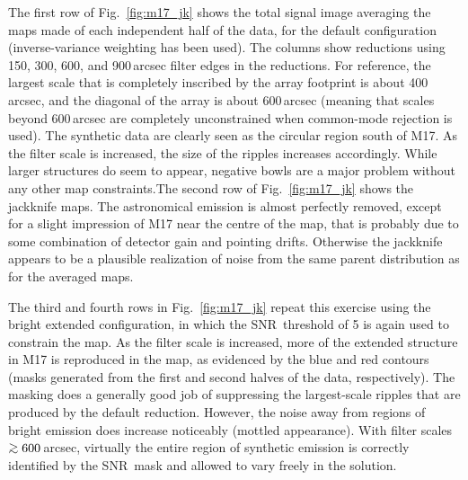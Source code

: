 \documentclass[useAMS,usenatbib,nofootinbib]{mn2e}
\newcommand{\snr}{SNR}
\def\gsim{\mathrel{\lower2.5pt\vbox{\lineskip=0pt\baselineskip=0pt
          \hbox{$>$}\hbox{$\sim$}}}}
\begin{document}
The first row of Fig.~\ref{fig:m17_jk} shows the total signal image
averaging the maps made of each independent half of the data, for the
default configuration (inverse-variance weighting has been used). The
columns show reductions using 150, 300, 600, and 900\,arcsec filter
edges in the reductions. For reference, the largest scale that is
completely inscribed by the array footprint is about 400\,arcsec, and
the diagonal of the array is about 600\,arcsec (meaning that scales
beyond 600\,arcsec are completely unconstrained when common-mode
rejection is used).  The synthetic data are clearly seen as the
circular region south of M17. As the filter scale is increased, the
size of the ripples increases accordingly. While larger structures do
seem to appear, negative bowls are a major problem without any other
map constraints.The second row of Fig.~\ref{fig:m17_jk} shows the
jackknife maps. The astronomical emission is almost perfectly removed,
except for a slight impression of M17 near the centre of the map, that
is probably due to some combination of detector gain and pointing
drifts. Otherwise the jackknife appears to be a plausible realization
of noise from the same parent distribution as for the averaged maps.

The third and fourth rows in Fig.~\ref{fig:m17_jk} repeat this
exercise using the bright extended configuration, in which the \snr\
threshold of 5 is again used to constrain the map. As the filter scale
is increased, more of the extended structure in M17 is reproduced in
the map, as evidenced by the blue and red contours (masks generated
from the first and second halves of the data, respectively). The
masking does a generally good job of suppressing the largest-scale
ripples that are produced by the default reduction. However, the noise
away from regions of bright emission does increase noticeably (mottled
appearance). With filter scales $\gsim600$\,arcsec, virtually the
entire region of synthetic emission is correctly identified by the \snr\
mask and allowed to vary freely in the solution.
\end{document}
